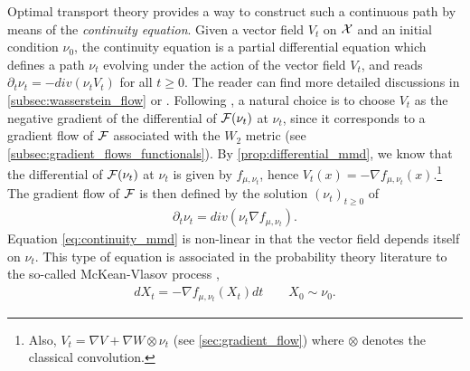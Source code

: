 Optimal transport theory provides a way to construct such a continuous path by means of the \textit{continuity equation}. Given a vector field $V_t$ on ${{\mathcal X}}$ and an initial condition $\nu_0$, the continuity equation is a partial differential equation which defines a path $\nu_t$ evolving under the action of the vector field $V_t$, and reads $\partial_t \nu_t = -div(\nu_t V_t)$ for all $t \geq 0$.
The reader can find more detailed discussions in \cref{subsec:wasserstein_flow} or \cite{Santambrogio:2015}. Following  \cite{ambrosio2008gradient}, a natural choice is to choose $V_t$ as the negative gradient of the differential of ${{\mathcal F}}(\nu_t)$ at $\nu_t$, since it corresponds to a gradient flow of ${{\mathcal F}}$ associated with the $W_2$ metric (see \cref{subsec:gradient_flows_functionals}). %
By \cref{prop:differential_mmd}, we know that the differential of ${{\mathcal F}}(\nu_t)$  at $\nu_t$ is given by $f_{\mu,\nu_t}$, hence $V_t(x) = -\nabla f_{\mu,\nu_t}(x)$.\footnote{Also, $V_t=\nabla V+\nabla W \otimes \nu_t$ (see \cref{sec:gradient_flow}) where $\otimes$ denotes the classical convolution.} The
gradient flow of ${{\mathcal F}}$ is then defined by the solution $(\nu_t)_{t\geq 0}$ of
\begin{align}\label{eq:continuity_mmd}
	\partial_t \nu_t = div(\nu_t \nabla f_{\mu,\nu_t}).
\end{align}
Equation \cref{eq:continuity_mmd} is non-linear in that the vector field depends itself on $\nu_t$. This type of equation is associated in the probability theory literature to the so-called McKean-Vlasov process \cite{kac1956foundations,mckean1966class},
\begin{align}\label{eq:mcKean_Vlasov_process}
	d X_t = -\nabla f_{\mu,\nu_t}(X_t)dt \qquad X_0\sim \nu_0.
\end{align}

